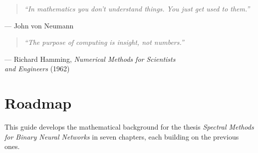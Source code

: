 \documentclass[12pt,a4paper]{report}
\theoremstyle{plain}
\theoremstyle{definition}
\theoremstyle{remark}
\begin{document}
\begin{quote}
\large\itshape
``In mathematics you don't understand things. You just get used to them.''
\end{quote}
\hfill --- John von Neumann

\vspace{2cm}

\begin{quote}
\large\itshape
``The purpose of computing is insight, not numbers.''
\end{quote}
\hfill --- Richard Hamming, \textit{Numerical Methods for Scientists}\\
\hfill\textit{and Engineers} (1962)

\newpage


\tableofcontents
\newpage

\chapter*{Roadmap}\label{ch:roadmap}

This guide develops the mathematical background for the thesis
\emph{Spectral Methods for Binary Neural Networks} in seven chapters,
each building on the previous ones.
\end{document}
